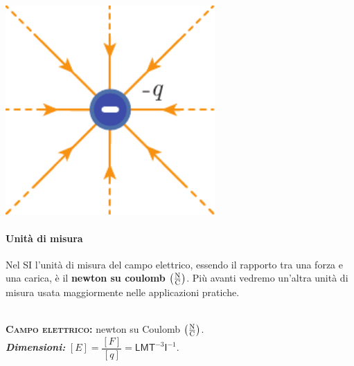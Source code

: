 \begin{define}
\begin{center}
\begin{minipage}{0.45\textwidth}
\begin{center}
				\includegraphics[width=0.6\textwidth]{images/chp1campocoulomb2.pdf}
			\end{center}
		\end{minipage}
	\end{center}
\end{define}
\paragraph{Unità di misura}
Nel SI l'unità di misura del campo elettrico, essendo il rapporto tra una forza e una carica, è il \textbf{newton su coulomb} $\left(\unit[per-mode = fraction]{\newton\per\coulomb}\right)$. Più avanti vedremo un'altra unità di misura usata maggiormente nelle applicazioni pratiche.
\begin{units}~\\
	\textbf{\textsc{Campo elettrico:}} newton su Coulomb $\left(\unit[per-mode = fraction]{\newton\per\coulomb}\right)$.\\
	\textit{\textbf{Dimensioni:}} $[E]=\dfrac{[F]}{[q]}=\mathsf{L}\mathsf{M}\mathsf{T}^{-3}\mathsf{I}^{-1}$.
\end{units}
